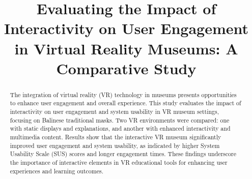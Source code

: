 \documentclass[conference]{IEEEtran}
\begin{document}
\title{Evaluating the Impact of Interactivity on User Engagement in Virtual Reality Museums: A Comparative Study}\\

\author{
\and
{}
\and
{}
\and
{}
}

\maketitle

\begin{abstract}
The integration of virtual reality (VR) technology in museums presents opportunities to enhance user engagement and overall experience. This study evaluates the impact of interactivity on user engagement and system usability in VR museum settings, focusing on Balinese traditional masks. Two VR environments were compared: one with static displays and explanations, and another with enhanced interactivity and multimedia content. Results show that the interactive VR museum significantly improved user engagement and system usability, as indicated by higher System Usability Scale (SUS) scores and longer engagement times. These findings underscore the importance of interactive elements in VR educational tools for enhancing user experiences and learning outcomes.
\end{abstract}
\end{document}

